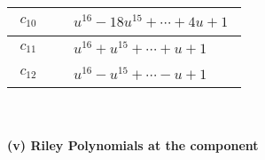 \documentclass[1p]{elsarticle_modified}
\theoremstyle{definition}
\begin{document}
\begin{tabular}{m{50pt}|m{274pt}}
\hline $$\begin{aligned}c_{10}\end{aligned}$$&$\begin{aligned}
&u^{16}-18 u^{15}+\cdots+4 u+1
\end{aligned}$\\
\hline $$\begin{aligned}c_{11}\end{aligned}$$&$\begin{aligned}
&u^{16}+u^{15}+\cdots+u+1
\end{aligned}$\\
\hline $$\begin{aligned}c_{12}\end{aligned}$$&$\begin{aligned}
&u^{16}- u^{15}+\cdots- u+1
\end{aligned}$\\
\hline
\end{tabular}\\~\\
\newpage\renewcommand{\arraystretch}{1}
\flushleft \textbf{(v) Riley Polynomials at the component}\newline \\
\end{document}
